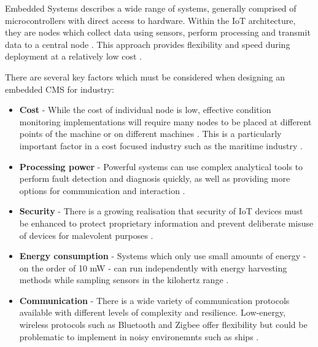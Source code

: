 Embedded Systems describes a wide range of systems, generally comprised of microcontrollers with direct access to hardware.
Within the IoT architecture, they are nodes which collect data using sensors, perform processing and transmit data to a central node \cite{Embedded_WSN}.
This approach provides flexibility and speed during deployment at a relatively low cost \cite{Embedded_WSN2}.

\par

There are several key factors which must be considered when designing an embedded CMS for industry:
\begin{itemize}
    \item \textbf{Cost} - While the cost of individual node is low, effective condition monitoring implementations will require many nodes to be placed at different points of the machine or on different machines \cite{Embedded_WSN}\cite{ISO13373-1}. This is a particularly important factor in a cost focused industry such as the maritime industry \cite{CBM_beyond_maritime}. 
    \item \textbf{Processing power} - Powerful systems can use complex analytical tools to perform fault detection and diagnosis quickly, as well as providing more options for communication and interaction \cite{Embedded_ANN}.
    \item \textbf{Security} - There is a growing realisation that security of IoT devices must be enhanced to protect proprietary information and prevent deliberate misuse of devices for malevolent purposes \cite{IoT_security}. 
    \item \textbf{Energy consumption} - Systems which only use small amounts of energy - on the order of 10 mW -  can run independently with energy harvesting methods while sampling sensors in the kilohertz range \cite{Embedded_Energy_Harvesting}.
    \item \textbf{Communication} - There is a wide variety of communication protocols available with different levels of complexity and resilience. Low-energy, wireless protocols such as Bluetooth and Zigbee offer flexibility but could be problematic to implement in noisy environemnts such as ships \cite{Embedded_Comms}.
\end{itemize}

